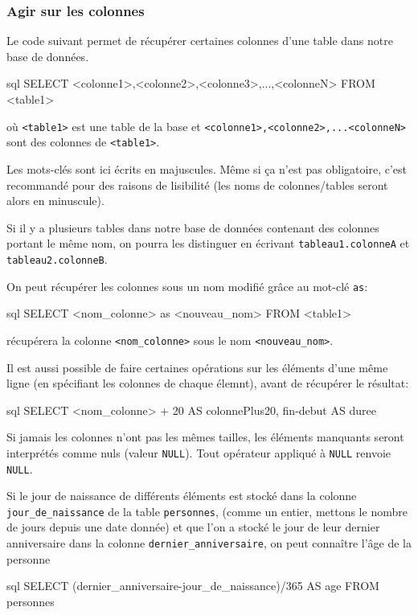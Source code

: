 \documentclass[a4paper]{scrartcl}
\begin{document}
			\subsubsection{Agir sur les colonnes}
				\semidef Le code suivant permet de récupérer certaines colonnes d'une table dans notre base de données.
				\begin{code}{sql}
					SELECT <colonne1>,<colonne2>,<colonne3>,...,<colonneN>
					FROM <table1>
				\end{code}
				où \texttt{<table1>} est une table de la base et \texttt{<colonne1>,<colonne2>,...<colonneN>} sont des colonnes de \texttt{<table1>}.

				\rem Les mots-clés sont ici écrits en majuscules. Même si ça n'est pas obligatoire, c'est recommandé pour des raisons de lisibilité
				(les noms de colonnes/tables seront alors en minuscule).
				
				\rem Si il y a plusieurs tables dans notre base de données contenant des colonnes portant le même nom,
				on pourra les distinguer en écrivant \texttt{tableau1.colonneA} et \texttt{tableau2.colonneB}.
				
				\semidef On peut récupérer les colonnes sous un nom modifié grâce au mot-clé \texttt{as}:
				\begin{code}{sql} 
					SELECT <nom_colonne> as <nouveau_nom>
					FROM <table1>
				\end{code}
				récupérera la colonne \texttt{<nom\_colonne>} sous le nom \texttt{<nouveau\_nom>}.

				Il est aussi possible de faire certaines opérations sur les éléments d'une même ligne (en spécifiant les colonnes de chaque élemnt), avant de récupérer le résultat:
				\begin{code}{sql}
					SELECT <nom_colonne> + 20 AS colonnePlus20, fin-debut AS duree
				\end{code}

				\rem Si jamais les colonnes n'ont pas les mêmes tailles, les éléments manquants seront interprétés comme nuls (valeur \texttt{NULL}).
				Tout opérateur appliqué à \texttt{NULL} renvoie \texttt{NULL}.

				\exemple Si le jour de naissance de différents éléments est stocké dans la colonne \texttt{jour\_de\_naissance} de la table \texttt{personnes},
				(comme un entier, mettons le nombre de jours depuis une date donnée)
				et que l'on a stocké le jour de leur dernier anniversaire dans la colonne \texttt{dernier\_anniversaire},
				on peut connaître l'âge de la personne
				\begin{code}{sql}
					SELECT (dernier_anniversaire-jour_de_naissance)/365 AS age
					FROM personnes 
				\end{code}
\end{document}
